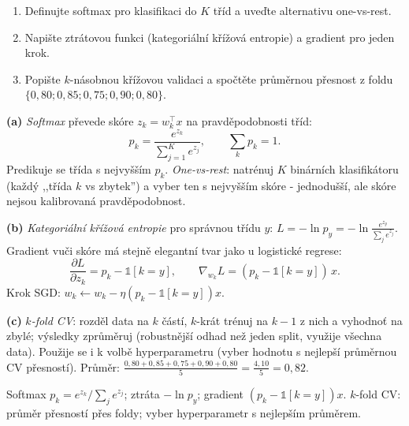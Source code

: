 \begin{zadani}
\begin{enumerate}[label=(\alph*)]
  \item {} Definujte softmax pro klasifikaci do $K$ tříd a uveďte alternativu one-vs-rest.
  \item {} Napište ztrátovou funkci (kategoriální křížová entropie) a gradient pro jeden krok.
  \item {} Popište $k$-násobnou křížovou validaci a spočtěte průměrnou přesnost z foldu $\{0{,}80;0{,}85;0{,}75;0{,}90;0{,}80\}$.
\end{enumerate}
\end{zadani}

\begin{reseni}
\textbf{(a)} \emph{Softmax} převede skóre $z_k=w_k^{\!\top}x$ na pravděpodobnosti tříd:
\[
p_k=\frac{e^{z_k}}{\sum_{j=1}^K e^{z_j}},\qquad \sum_k p_k=1.
\]
Predikuje se třída s nejvyšším $p_k$. \emph{One-vs-rest}: natrénuj $K$ binárních klasifikátoru (každý ,,třída $k$ vs zbytek'') a vyber ten s nejvyšším skóre - jednodušší, ale skóre nejsou kalibrovaná pravděpodobnost.

\textbf{(b)} \emph{Kategoriální křížová entropie} pro správnou třídu $y$: $L=-\ln p_y=-\ln\frac{e^{z_y}}{\sum_j e^{z_j}}$. Gradient vuči skóre má stejně elegantní tvar jako u logistické regrese:
\[
\frac{\partial L}{\partial z_k}=p_k-\mathbb{1}[k=y],\qquad \nabla_{w_k}L=(p_k-\mathbb{1}[k=y])\,x.
\]
Krok SGD: $w_k\leftarrow w_k-\eta(p_k-\mathbb{1}[k=y])x$.

\textbf{(c)} \emph{$k$-fold CV}: rozděl data na $k$ částí, $k$-krát trénuj na $k-1$ z nich a vyhodnoť na zbylé; výsledky zprůměruj (robustnější odhad než jeden split, využije všechna data). Použije se i k volbě hyperparametru (vyber hodnotu s nejlepší průměrnou CV přesností). Průměr: $\frac{0{,}80+0{,}85+0{,}75+0{,}90+0{,}80}{5}=\frac{4{,}10}{5}=0{,}82$.
\end{reseni}

\begin{jadro}
Softmax $p_k=e^{z_k}/\sum_j e^{z_j}$; ztráta $-\ln p_y$; gradient $(p_k-\mathbb{1}[k{=}y])x$. $k$-fold CV: průměr přesností přes foldy; vyber hyperparametr s nejlepším průměrem.
\end{jadro}

